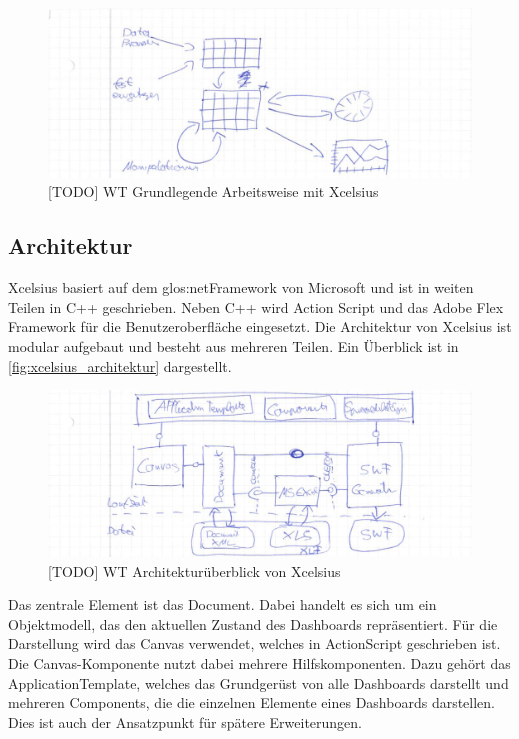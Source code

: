 \begin{onehalfspacing}
\begin{figure}[h]
\centering
\setlength{\unitlength}{1mm}
\includegraphics[width=15cm]{images/Xcelsius_UI_Ablauf.jpg}
\caption{[TODO] WT Grundlegende Arbeitsweise mit Xcelsius\label{fig:xcelsius_ablauf_schema}}
\end{figure}

\subsection{Architektur}

Xcelsius basiert auf dem \gls{glos:netFramework} von Microsoft und ist in weiten Teilen in C++ geschrieben. Neben C++ wird Action Script und das Adobe Flex Framework für die  Benutzeroberfläche eingesetzt. Die Architektur von Xcelsius ist modular aufgebaut und besteht aus mehreren Teilen. Ein Überblick ist in \vref{fig:xcelsius_architektur} dargestellt.

\begin{figure}[h]
\centering
\setlength{\unitlength}{1mm}
\includegraphics[width=15cm]{images/Xcelsius_Architecture.jpg}
\caption{[TODO] WT Architekturüberblick von Xcelsius\label{fig:xcelsius_architektur}}
\end{figure}

Das zentrale Element ist das Document. Dabei handelt es sich um ein Objektmodell, das den aktuellen Zustand des Dashboards repräsentiert. Für die Darstellung wird das Canvas verwendet, welches in ActionScript geschrieben ist. Die Canvas-Komponente nutzt dabei mehrere Hilfskomponenten. Dazu gehört das ApplicationTemplate, welches das Grundgerüst von alle Dashboards darstellt und mehreren Components, die die einzelnen Elemente eines Dashboards darstellen. Dies ist auch der Ansatzpunkt für spätere Erweiterungen.


\end{onehalfspacing}
